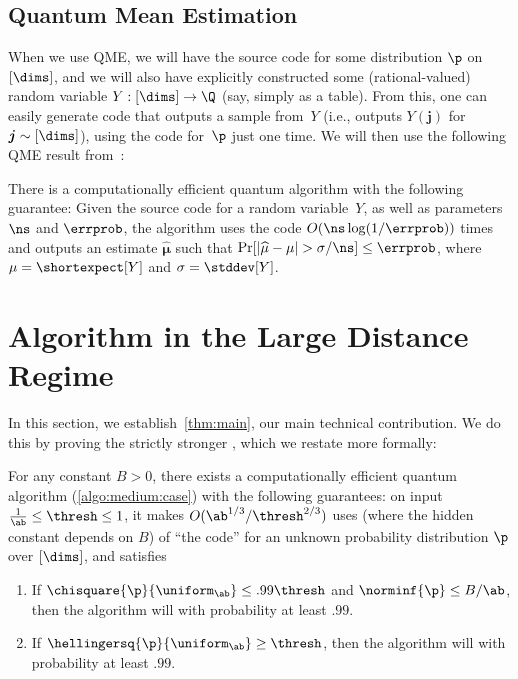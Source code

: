 \documentclass[11pt]{article}
\newcommand{\E}{\shortexpect}
\newcommand{\wh}[1]{\widehat{#1}}
\newcommand{\bj}{\boldsymbol{j}}
\newcommand{\bmu}{\boldsymbol{\mu}}
\begin{document}
\subsection{Quantum Mean Estimation}
When we use QME, we will have the source code for some distribution $\p$ on $[\dims]$, and we will also have explicitly constructed some (rational-valued) random variable $Y : [\dims] \to \Q$ (say, simply as a table).  
From this, one can easily generate code that outputs a sample from~$Y$ (i.e., outputs $Y(\bj)$ for $\bj \sim [\dims]$), using the code for~$\p$ just one time.
We will then use the following QME result from~\cite{KO23}:
\begin{theorem} \label{thm:QME}
  There is a computationally efficient quantum algorithm with the following guarantee: Given the source code for a random variable~$Y$, as well as parameters $\ns$ and $\errprob$, the algorithm uses the code $O(\ns \log(1/\errprob))$ times and outputs an estimate $\wh{\bmu}$  such that $\Pr[|\wh{\mu} - \mu| > \sigma/\ns] \leq \errprob$, where $\mu = \E[Y]$ and $\sigma = \stddev[Y]$.
\end{theorem}

\section{Algorithm in the Large Distance Regime}
  \label{sec:large}
%
\newcommand{\cc}{c}
\newcommand{\cq}{C}
In this section, we establish~\cref{thm:main}, our main technical contribution. 
We do this by proving the strictly stronger , which we restate more formally:
\begin{theorem}
	\label{theo:medium:case}
For any constant $B > 0$, there exists a computationally efficient quantum algorithm (\cref{algo:medium:case}) with the following guarantees: on input $\frac{1}{\ab} \leq \thresh \leq 1$, it makes 
$O(\ab^{1/3}/\thresh^{2/3})$  uses (where the hidden constant depends on $B$) of ``the code'' for an unknown probability distribution $\p$ over $[\dims]$, and satisfies
\begin{enumerate}
	\item If $\chisquare{\p}{\uniform_{\ab}} \leq .99 \thresh$ and $\norminf{\p} \leq B/\ab$, then the algorithm will \accept with probability at least $.99$.
	\item If $\hellingersq{\p}{\uniform_{\ab}} \geq \thresh$, %
	then  the algorithm will \reject with probability at least $.99$.%
\end{enumerate}
\end{theorem}
\end{document}
